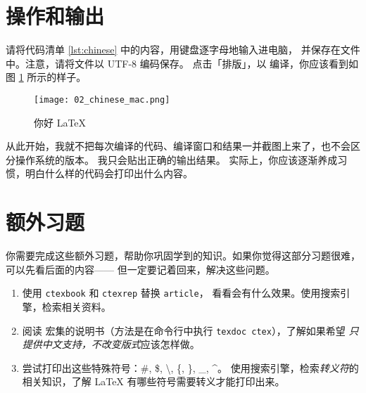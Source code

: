 \section{操作和输出}

请将代码清单 \ref{lst:chinese} 中的内容，用键盘逐字母地输入进电脑，
并保存在文件  中。注意，请将文件以 UTF-8 编码保存。
点击「排版」，以 \XeLaTeX{} 编译，你应该看到如图 \ref{fig:chinese} 所示的样子。

\begin{figure}[!htb]
\centering
\texttt{[image: 02\_chinese\_mac.png]}
\caption{你好 \LaTeX{}}\label{fig:chinese}
\end{figure}

从此开始，我就不把每次编译的代码、编译窗口和结果一并截图上来了，也不会区分操作系统的版本。
我只会贴出正确的输出结果。
实际上，你应该逐渐养成习惯，明白什么样的代码会打印出什么内容。

\section{额外习题}

你需要完成这些额外习题，帮助你巩固学到的知识。如果你觉得这部分习题很难，可以先看后面的内容——
但一定要记着回来，解决这些问题。

\begin{enumerate}
  \item 使用 \lstinline[style = iltx]|ctexbook| 和
  \lstinline[style = iltx]|ctexrep| 替换 \lstinline[style = iltx]|article|，
  看看会有什么效果。使用搜索引擎，检索相关资料。
  \item 阅读 \ctex{} 宏集的说明书（方法是在命令行中执行
  \lstinline[style = ibash]|texdoc ctex|），了解如果希望%
  \emph{只提供中文支持，不改变版式}应该怎样做。
  \item 尝试打印出这些特殊符号：\#, \$, \textbackslash, \{, \}, \_, \^{}。
  使用搜索引擎，检索\emph{转义符}的相关知识，了解 \LaTeX{} 有哪些符号需要转义才能打印出来。
\end{enumerate}

\endinput
